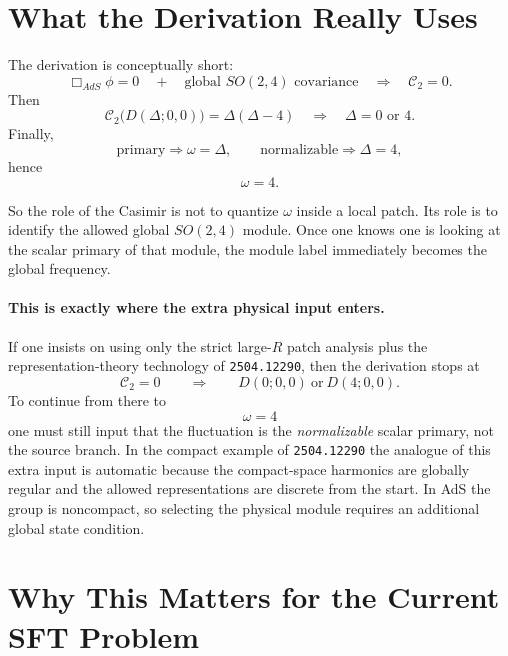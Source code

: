 \documentclass[12pt]{article}
\newcommand{\D}{\Delta}
\newcommand{\cC}{\mathcal{C}}
\begin{document}
\section{What the Derivation Really Uses}

The derivation is conceptually short:
\begin{equation}
\Box_{AdS}\phi=0
\quad + \quad
\text{global } SO(2,4)\text{ covariance}
\quad \Longrightarrow \quad
\cC_2=0.
\end{equation}
Then
\begin{equation}
\cC_2\big(D(\D;0,0)\big)=\D(\D-4)
\quad \Longrightarrow \quad
\D=0 \text{ or } 4.
\end{equation}
Finally,
\begin{equation}
\text{primary} \Rightarrow \omega=\D,
\qquad
\text{normalizable} \Rightarrow \D=4,
\end{equation}
hence
\begin{equation}
\omega=4.
\end{equation}

So the role of the Casimir is not to quantize $\omega$ inside a local patch.  Its role is to identify the
allowed global $SO(2,4)$ module.  Once one knows one is looking at the scalar primary of that module, the
module label immediately becomes the global frequency.

\paragraph{This is exactly where the extra physical input enters.}
If one insists on using only the strict large-$R$ patch analysis plus the representation-theory technology
of \texttt{2504.12290}, then the derivation stops at
\begin{equation}
\cC_2=0
\qquad \Longrightarrow \qquad
D(0;0,0)\ \text{or}\ D(4;0,0).
\end{equation}
To continue from there to
\begin{equation}
\omega=4
\end{equation}
one must still input that the fluctuation is the \emph{normalizable} scalar primary, not the source
branch.  In the compact example of \texttt{2504.12290} the analogue of this extra input is automatic
because the compact-space harmonics are globally regular and the allowed representations are discrete from
the start.  In AdS the group is noncompact, so selecting the physical module requires an additional global
state condition.

\section{Why This Matters for the Current SFT Problem}
\end{document}
